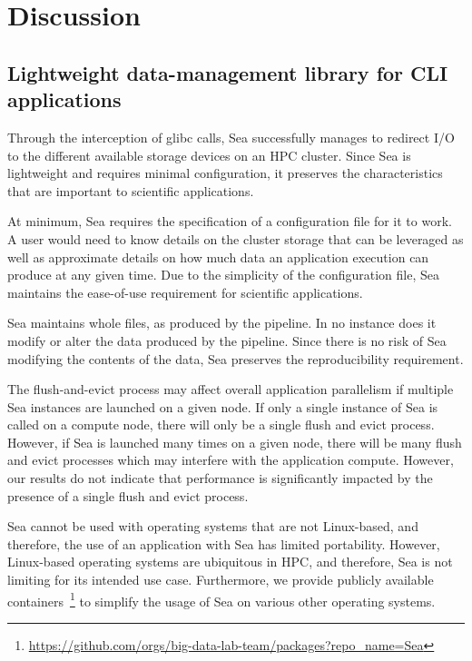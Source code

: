 \documentclass[10pt,journal,compsoc]{IEEEtran}
\begin{document}
\section{Discussion}

    \subsection{Lightweight data-management library for CLI applications}

    Through the interception of glibc calls, Sea successfully manages to
    redirect I/O to the different available storage devices on an HPC cluster.
    Since Sea is lightweight and requires minimal configuration, it preserves
    the characteristics that are important to scientific applications.

    At minimum, Sea requires the specification of a configuration file for it to
    work. A user would need to know details on the cluster storage that can be
    leveraged as well as approximate details on how much data an application
    execution can produce at any given time. Due to the simplicity of the
    configuration file, Sea maintains the ease-of-use requirement for scientific
    applications.

    Sea maintains whole files, as produced by the pipeline. In no instance does
    it modify or alter the data produced by the pipeline. Since there is no risk
    of Sea modifying the contents of the data, Sea preserves the reproducibility
    requirement.

    The flush-and-evict process may affect overall application parallelism if multiple Sea instances
    are launched on a given node. If
    only a single instance of Sea is called on a compute node, there will only
    be a single flush and evict process. However, if Sea is launched many times on a given
    node, there will be many flush and evict processes which may interfere with
    the application compute. However, our results do not indicate that
    performance is significantly impacted by the presence of a single flush and
    evict process.  

    Sea cannot be used with operating systems that are not Linux-based, and
    therefore, the use of an application with Sea has limited portability. However, Linux-based operating systems
    are ubiquitous in HPC, and therefore, Sea is not limiting for
    its intended use case. Furthermore, we provide publicly available containers~\footnote{\url{https://github.com/orgs/big-data-lab-team/packages?repo_name=Sea}}
    to simplify the usage of Sea on various other operating systems.
\end{document}
